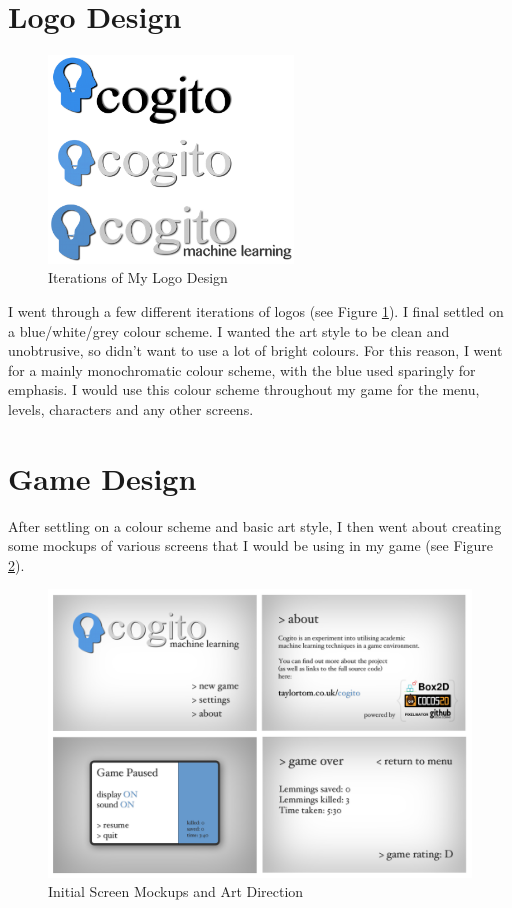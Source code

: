 \documentclass[a4paper,oneside]{report}
\begin{document}
\section{Logo Design}
	
\begin{figure}
  \centering
    \includegraphics[width=65mm]{sources/images/cogito_logo1}
    \caption{Iterations of My Logo Design}
    \label{fig:Logos}
\end{figure}
	
I went through a few different iterations of logos (see Figure \ref{fig:Logos}). I final settled on a blue/white/grey colour scheme. I wanted the art style to be clean and unobtrusive, so didn't want to use a lot of bright colours. For this reason, I went for a mainly monochromatic colour scheme, with the blue used sparingly for emphasis. I would use this colour scheme throughout my game for the menu, levels, characters and any other screens.

\section{Game Design}

After settling on a colour scheme and basic art style, I then went about creating some mockups of various screens that I would be using in my game (see Figure \ref{fig:ScreenMockups}).
	
\begin{figure}[h!]
  \centering
    \includegraphics[width=140mm]{sources/images/Screens}
    \caption{Initial Screen Mockups and Art Direction}
    \label{fig:ScreenMockups}
\end{figure}
\end{document}
